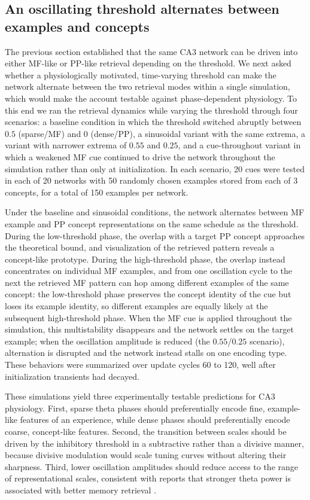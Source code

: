 \documentclass[11pt]{article}
\begin{document}
\subsection{An oscillating threshold alternates between examples and concepts}

The previous section established that the same CA3 network can be driven
into either MF-like or PP-like retrieval depending on the threshold. We
next asked whether a physiologically motivated, time-varying threshold can
make the network alternate between the two retrieval modes within a single
simulation, which would make the account testable against phase-dependent
physiology. To this end we ran the retrieval dynamics while varying the
threshold through four scenarios: a baseline condition in which the
threshold switched abruptly between $0.5$ (sparse/MF) and $0$ (dense/PP),
a sinusoidal variant with the same extrema, a variant with narrower
extrema of $0.55$ and $0.25$, and a cue-throughout variant in which a
weakened MF cue continued to drive the network throughout the simulation
rather than only at initialization. In each scenario, 20 cues were tested
in each of 20 networks with 50 randomly chosen examples stored from each
of 3 concepts, for a total of 150 examples per network.

Under the baseline and sinusoidal conditions, the network alternates
between MF example and PP concept representations on the same schedule as
the threshold. During the low-threshold phase, the overlap with a target
PP concept approaches the theoretical bound, and visualization of the
retrieved pattern reveals a concept-like prototype. During the high-threshold
phase, the overlap instead concentrates on individual MF examples, and from
one oscillation cycle to the next the retrieved MF pattern can hop among
different examples of the same concept: the low-threshold phase preserves
the concept identity of the cue but loses its example identity, so
different examples are equally likely at the subsequent high-threshold
phase. When the MF cue is applied throughout the simulation, this
multistability disappears and the network settles on the target example;
when the oscillation amplitude is reduced (the $0.55$/$0.25$ scenario),
alternation is disrupted and the network instead stalls on one encoding
type. These behaviors were summarized over update cycles 60 to 120, well
after initialization transients had decayed.

These simulations yield three experimentally testable predictions for CA3
physiology. First, sparse theta phases should preferentially encode fine,
example-like features of an experience, while dense phases should
preferentially encode coarse, concept-like features. Second, the transition
between scales should be driven by the inhibitory threshold in a
subtractive rather than a divisive manner, because divisive modulation
would scale tuning curves without altering their sharpness. Third, lower
oscillation amplitudes should reduce access to the range of representational
scales, consistent with reports that stronger theta power is associated
with better memory retrieval \cite{okeefe1993phase,tsodyks1996population}.
\end{document}
